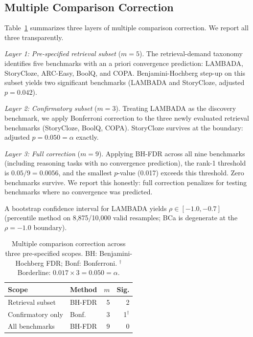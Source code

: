 \documentclass[11pt]{article}
\begin{document}
\subsection{Multiple Comparison Correction}
\label{sec:correction}

Table~\ref{tab:correction} summarizes three layers of multiple comparison correction.
We report all three transparently.

\textit{Layer 1: Pre-specified retrieval subset} ($m = 5$).
The retrieval-demand taxonomy identifies five benchmarks with an a priori convergence prediction: LAMBADA, StoryCloze, ARC-Easy, BoolQ, and COPA.
Benjamini-Hochberg step-up on this subset yields two significant benchmarks (LAMBADA and StoryCloze, adjusted $p = 0.042$).

\textit{Layer 2: Confirmatory subset} ($m = 3$).
Treating LAMBADA as the discovery benchmark, we apply Bonferroni correction to the three newly evaluated retrieval benchmarks (StoryCloze, BoolQ, COPA).
StoryCloze survives at the boundary: adjusted $p = 0.050 = \alpha$ exactly.

\textit{Layer 3: Full correction} ($m = 9$).
Applying BH-FDR across all nine benchmarks (including reasoning tasks with no convergence prediction), the rank-1 threshold is $0.05/9 = 0.0056$, and the smallest $p$-value (0.017) exceeds this threshold.
Zero benchmarks survive.
We report this honestly: full correction penalizes for testing benchmarks where no convergence was predicted.

A bootstrap confidence interval for LAMBADA yields $\rho \in [{-}1.0, {-}0.7]$ (percentile method on 8,875/10,000 valid resamples; BCa is degenerate at the $\rho = {-}1.0$ boundary).

\begin{table}[t]
\centering
\caption{Multiple comparison correction across three pre-specified scopes. BH: Benjamini-Hochberg FDR; Bonf: Bonferroni. $^\dagger$Borderline: $0.017 \times 3 = 0.050 = \alpha$.}
\label{tab:correction}
\small
\begin{tabular}{llrr}
\toprule
Scope & Method & $m$ & Sig. \\
\midrule
Retrieval subset & BH-FDR & 5 & 2 \\
Confirmatory only & Bonf. & 3 & 1$^\dagger$ \\
All benchmarks & BH-FDR & 9 & 0 \\
\bottomrule
\end{tabular}
\end{table}

\end{document}

